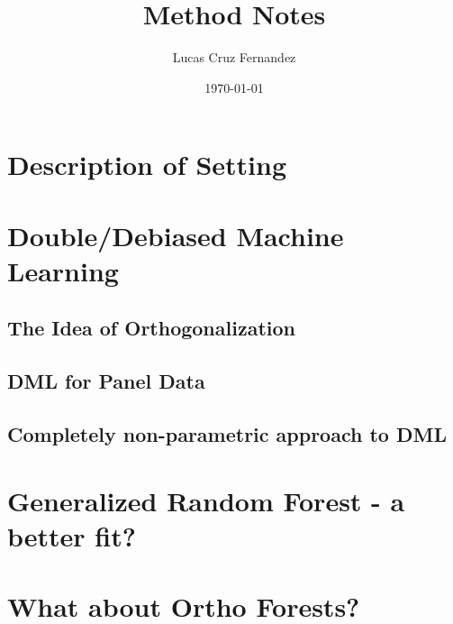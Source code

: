 \documentclass[12pt]{article}
\title{Method Notes}
\author{Lucas Cruz Fernandez}
\date{\today}
\begin{document}
    \maketitle 

    \tableofcontents
    \newpage 

    \section{Description of Setting}
    
    \section{Double/Debiased Machine Learning}

    \subsection{The Idea of Orthogonalization}

    \subsection{DML for Panel Data}

    \subsection{Completely non-parametric approach to DML}

    \section{Generalized Random Forest - a better fit?}

    \section{What about Ortho Forests?}
\end{document}
